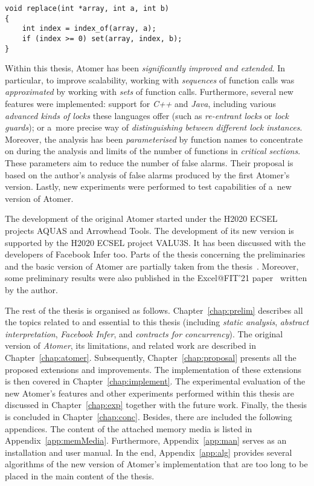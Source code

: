 \begin{lstlisting}[style=c, label={list:exampleViolation}, float=hbt, caption={An example of an \emph{atomicity violation}}]
void replace(int *array, int a, int b)
{
    int index = index_of(array, a);
    if (index >= 0) set(array, index, b);
}
\end{lstlisting}

Within this thesis, Atomer has been \emph{significantly improved and extended}. In particular, to improve scalability, working with \emph{sequences} of function calls was \emph{approximated} by working with \emph{sets} of function calls. Furthermore, several new features were implemented: support for \emph{C++} and \emph{Java}, including various \emph{advanced kinds of locks} these languages offer (such as \emph{re-entrant locks} or \emph{lock guards}); or a~more precise way of \emph{distinguishing between different lock instances}. Moreover, the analysis has been \emph{parameterised} by function names to concentrate on during the analysis and limits of the number of functions in \emph{critical sections}. These parameters aim to reduce the number of false alarms. Their proposal is based on the author's analysis of false alarms produced by the first Atomer's version. Lastly, new experiments were performed to test capabilities of a~new version of Atomer.

The development of the original Atomer started under the H2020 ECSEL projects AQUAS and Arrowhead Tools. The development of its new version is supported by the H2020 ECSEL project VALU3S. It has been discussed with the developers of Facebook Infer too. Parts of the thesis concerning the preliminaries and the basic version of Atomer are partially taken from the thesis~\cite{harmimBP}. Moreover, some preliminary results were also published in the Excel@FIT'21 paper~\cite{excel2021Harmim} written by the author.

The rest of the thesis is organised as follows. Chapter~\ref{chap:prelim} describes all the topics related to and essential to this thesis (including \emph{static analysis}, \emph{abstract interpretation}, \emph{Facebook Infer}, and \emph{contracts for concurrency}). The original version of \emph{Atomer}, its limitations, and related work are described in Chapter~\ref{chap:atomer}. Subsequently, Chapter~\ref{chap:proposal} presents all the proposed extensions and improvements. The implementation of these extensions is then covered in Chapter~\ref{chap:implement}. The experimental evaluation of the new Atomer's features and other experiments performed within this thesis are discussed in Chapter~\ref{chap:exp} together with the future work. Finally, the thesis is concluded in Chapter~\ref{chap:conc}. Besides, there are included the following appendices. The content of the attached memory media is listed in Appendix~\ref{app:memMedia}. Furthermore, Appendix~\ref{app:man} serves as an installation and user manual. In the end, Appendix~\ref{app:alg} provides several algorithms of the new version of Atomer's implementation that are too long to be placed in the main content of the thesis.



